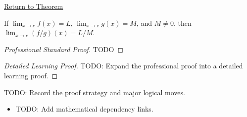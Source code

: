 \newpage
{}
\label{prf:quotient-rule-function-limits}

\begin{remark*}[Return]
\hyperref[thm:quotient-rule-function-limits]{Return to Theorem}
\end{remark*}

\begin{theorem*}
If $\lim_{x\to c}f(x)=L$, $\lim_{x\to c}g(x)=M$, and $M\neq 0$, then $\lim_{x\to c}(f/g)(x)=L/M$.
\end{theorem*}

\begin{proof}[Professional Standard Proof]
\LRAProofBodyStart
TODO
\end{proof}

\begin{proof}[Detailed Learning Proof]
\LRAProofBodyStart
TODO: Expand the professional proof into a detailed learning proof.
\end{proof}

\begin{remark*}
TODO: Record the proof strategy and major logical moves.
\end{remark*}

\begin{dependencies}
\begin{itemize}
  \item TODO: Add mathematical dependency links.
\end{itemize}
\end{dependencies}
